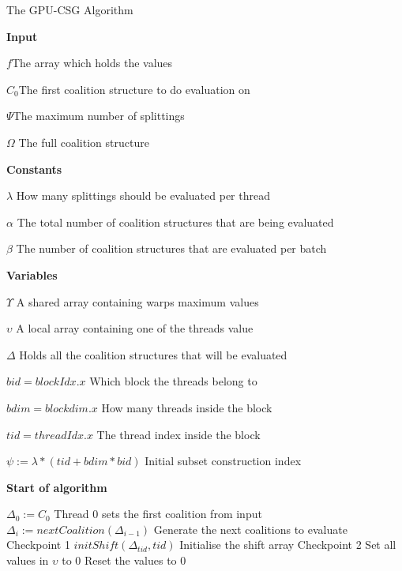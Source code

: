 \documentclass{llncs}
\begin{document}
\begin{algorithm}[!t]
\caption{The GPU-CSG Algorithm\label{gpudp}}
\textbf{Input}

$f$\hfill The array which holds the values

$C_0$\hfill The first coalition structure to do evaluation on

$\Psi$\hfill The maximum number of splittings

$\Omega$ \hfill The full coalition structure

\textbf{Constants}

$\lambda$ \hfill How many splittings should be evaluated per thread

$\alpha$ \hfill The total number of coalition structures that are being evaluated

$\beta$ \hfill The number of coalition structures that are evaluated per batch

\textbf{Variables} 

$\Upsilon$ \hfill A shared array containing warps maximum values

$\upsilon$ \hfill A local array containing one of the threads value

$\Delta$ \hfill Holds all the coalition structures that will be evaluated

$bid = blockIdx.x$ \hfill Which block the threads belong to



$bdim = blockdim.x$ \hfill How many threads inside the block

$tid = threadIdx.x$ \hfill The thread index inside the block

$\psi := \lambda*(tid+bdim*bid)$ \hfill Initial subset construction index

\textbf{Start of algorithm}
\begin{algorithmic}[1]
  \STATE $\Delta_0 := C_0$ \hfill Thread 0 sets the first coalition from input
    \STATE $\Delta_i := nextCoalition(\Delta_{i-1})$ \hfill Generate the next coalitions to evaluate
  \ENDFOR \hfill Checkpoint 1
\ENDIF
{}
  \STATE $initShift(\Delta_{tid},tid)$ \hfill Initialise the shift array
\ENDIF
\hfill Checkpoint 2
\label{lst:line:bigfetch}
  \STATE Set all values in $\upsilon$ to 0 \hfill Reset the values to 0


\end{algorithmic}
\end{algorithm}
\end{document}
